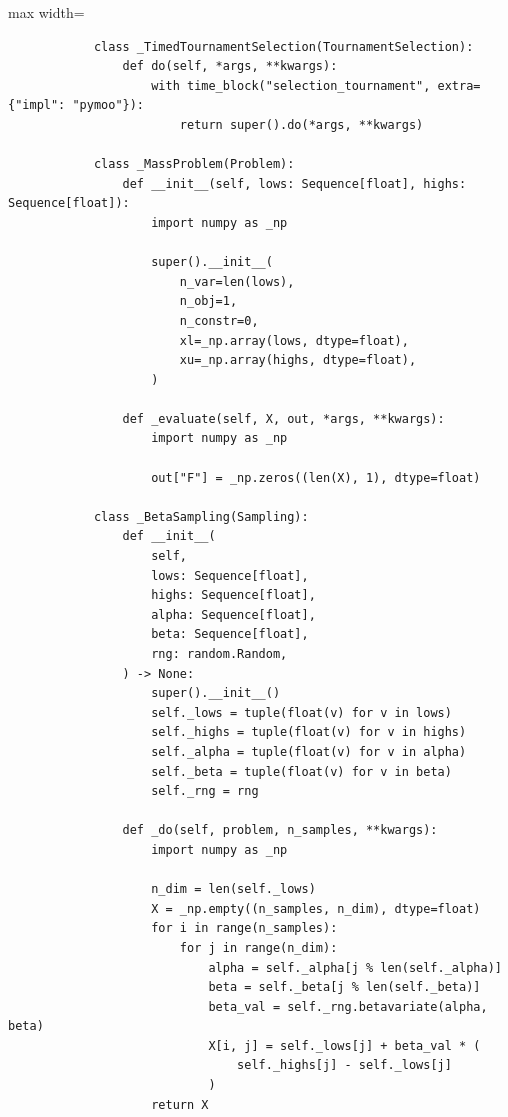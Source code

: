 \begin{listing}[H]
\begin{adjustbox}{max width=\textwidth}
\begin{minipage}{0.85\textwidth}
\begin{verbatim}
            class _TimedTournamentSelection(TournamentSelection):
                def do(self, *args, **kwargs):
                    with time_block("selection_tournament", extra={"impl": "pymoo"}):
                        return super().do(*args, **kwargs)

            class _MassProblem(Problem):
                def __init__(self, lows: Sequence[float], highs: Sequence[float]):
                    import numpy as _np

                    super().__init__(
                        n_var=len(lows),
                        n_obj=1,
                        n_constr=0,
                        xl=_np.array(lows, dtype=float),
                        xu=_np.array(highs, dtype=float),
                    )

                def _evaluate(self, X, out, *args, **kwargs):
                    import numpy as _np

                    out["F"] = _np.zeros((len(X), 1), dtype=float)

            class _BetaSampling(Sampling):
                def __init__(
                    self,
                    lows: Sequence[float],
                    highs: Sequence[float],
                    alpha: Sequence[float],
                    beta: Sequence[float],
                    rng: random.Random,
                ) -> None:
                    super().__init__()
                    self._lows = tuple(float(v) for v in lows)
                    self._highs = tuple(float(v) for v in highs)
                    self._alpha = tuple(float(v) for v in alpha)
                    self._beta = tuple(float(v) for v in beta)
                    self._rng = rng

                def _do(self, problem, n_samples, **kwargs):
                    import numpy as _np

                    n_dim = len(self._lows)
                    X = _np.empty((n_samples, n_dim), dtype=float)
                    for i in range(n_samples):
                        for j in range(n_dim):
                            alpha = self._alpha[j % len(self._alpha)]
                            beta = self._beta[j % len(self._beta)]
                            beta_val = self._rng.betavariate(alpha, beta)
                            X[i, j] = self._lows[j] + beta_val * (
                                self._highs[j] - self._lows[j]
                            )
                    return X


\end{verbatim}
\end{minipage}
\end{adjustbox}
\end{listing}
